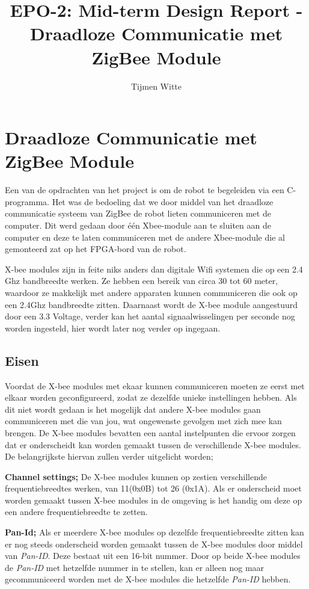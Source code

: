 \documentclass{report}
\title{EPO-2: Mid-term Design Report - Draadloze Communicatie met ZigBee Module}
\author{Tijmen Witte}
\begin{document}
\chapter{Draadloze Communicatie met ZigBee Module}

Een van de opdrachten van het project is om de robot te begeleiden via een C-programma. Het was de bedoeling dat we door middel van het draadloze communicatie systeem van ZigBee de robot lieten communiceren met de computer. Dit werd gedaan door één Xbee-module aan te sluiten aan de computer en deze te laten communiceren met de andere Xbee-module die al gemonteerd zat op het FPGA-bord van de robot.
\newline

X-bee modules zijn in feite niks anders dan digitale Wifi systemen die op een 2.4 Ghz bandbreedte werken. Ze hebben een bereik van circa 30 tot 60 meter, waardoor ze makkelijk met andere apparaten kunnen communiceren die ook op een 2.4Ghz bandbreedte zitten. Daarnaast wordt de X-bee module aangestuurd door een 3.3 Voltage, verder kan het aantal signaalwisselingen per seconde nog worden ingesteld, hier wordt later nog verder op ingegaan.
\newline

\section{Eisen}

Voordat de X-bee modules met ekaar kunnen communiceren moeten ze eerst met elkaar worden geconfigureerd, zodat ze dezelfde unieke instellingen hebben. Als dit niet wordt gedaan is het mogelijk dat andere X-bee modules gaan communiceren met die van jou, wat ongewenste gevolgen met zich mee kan brengen. 
\newline
De X-bee modules bevatten een aantal instelpunten die ervoor zorgen dat er onderscheidt kan worden gemaakt tussen de verschillende X-bee modules. De belangrijkste hiervan zullen verder uitgelicht worden;
\newline

\textbf{Channel settings;}
\newline
De X-bee modules kunnen op zestien verschillende frequentiebreedtes werken, van 11(0x0B) tot 26 (0x1A). Als er onderscheid moet worden gemaakt tussen X-bee modules in de omgeving is het handig om deze op een andere frequentiebreedte te zetten.
\newline

\textbf{Pan-Id;}
\newline
Als er meerdere X-bee modules op dezelfde frequentiebreedte zitten kan er nog steeds onderscheid worden gemaakt tussen de X-bee modules door middel van \textit{Pan-ID}. Deze bestaat uit een 16-bit nummer. Door op beide X-bee modules de \textit{Pan-ID}  met hetzelfde nummer in te stellen, kan er alleen nog maar gecommuniceerd worden met de X-bee modules die hetzelfde \textit{Pan-ID} hebben.
\newline
\end{document}
